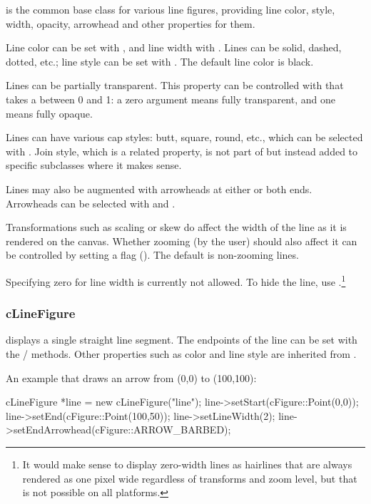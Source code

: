  is the common base class for various line
figures, providing line color, style, width, opacity, arrowhead and other
properties for them.

Line color can be set with , and line width with
. Lines can be solid, dashed, dotted, etc.; line
style can be set with . The default line color is
black.

Lines can be partially transparent. This property can be controlled with
 that takes a  between 0 and 1: a zero
argument means fully transparent, and one means fully opaque.

Lines can have various cap styles: butt, square, round, etc., which can be
selected with . Join style, which is a related
property, is not part of  but instead added to
specific subclasses where it makes sense.

Lines may also be augmented with arrowheads at either or both ends.
Arrowheads can be selected with  and
.

Transformations such as scaling or skew do affect the width of the line as it
is rendered on the canvas. Whether zooming (by the user) should also affect
it can be controlled by setting a flag ().
The default is non-zooming lines.

Specifying zero for line width is currently not allowed. To hide the line,
use .\footnote{It would make sense to display
zero-width lines as hairlines that are always rendered as one pixel wide
regardless of transforms and zoom level, but that is not possible on all
platforms.}


\subsubsection{cLineFigure}
\label{sec:graphics:linefigure}

 displays a single straight line segment. The endpoints
of the line can be set with the /
methods. Other properties such as color and line style are inherited from
.

An example that draws an arrow from (0,0) to (100,100):

\begin{cpp}
cLineFigure *line = new cLineFigure("line");
line->setStart(cFigure::Point(0,0));
line->setEnd(cFigure::Point(100,50));
line->setLineWidth(2);
line->setEndArrowhead(cFigure::ARROW_BARBED);
\end{cpp}

